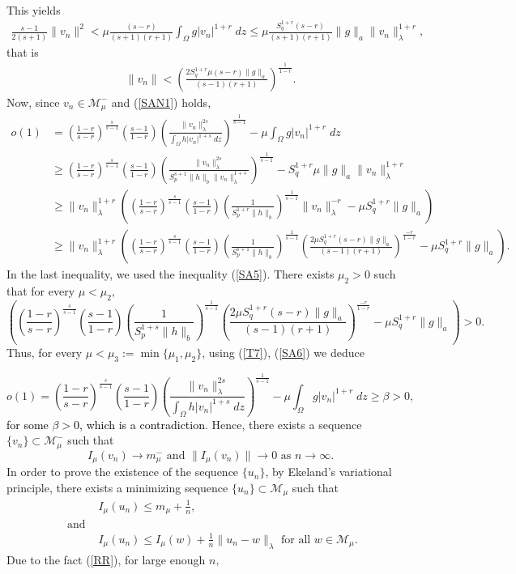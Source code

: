 \documentclass[12pt, notitlepage]{article}
\begin{document}
{\begin{align}
 \end{align}
This yields
\begin{align}
    \frac{s-1}{2(s+1)}\|v_n\|^2<\mu\frac{(s-r)}{(s+1)(r+1)}\int_\Omega g|v_n|^{1+r}\;dz\leq \mu\frac{S_q^{1+r}(s-r)}{(s+1)(r+1)}\|g\|_a\|v_n\|_\lambda^{1+r},
\end{align}
that is
\begin{align}\label{SA5}
    \|v_n\|<\left ( \frac{2S_q^{1+r}\mu(s-r)\|g\|_a}{(s-1)(r+1)}  \right )^\frac{1}{1-r}.
\end{align}
Now, since $v_n\in\mathcal{M}^-_\mu$ and (\ref{SAN1}) holds,
\begin{align}\label{SA6}
o(1)&=\left(\frac{1-r}{s-r}\right)^\frac{s}{s-1}\left(\frac{s-1}{1-r}\right)\left(\frac{\|v_n\|_\lambda^{2s}}{\int_\Omega h|v_n|^{1+s}\;dz}\right )^\frac{1}{s-1}-\mu\int_\Omega g|v_n|^{1+r}\;dz\nonumber\\
&\geq \left(\frac{1-r}{s-r}\right)^\frac{s}{s-1}\left(\frac{s-1}{1-r}\right)\left(\frac{\|v_n\|_\lambda^{2s}}{S_p^{s+1}\|h\|_b\|v_n\|_\lambda^{1+s}}\right )^\frac{1}{s-1}-S_q^{1+r}\mu\|g\|_a\|v_n\|_\lambda^{1+r}\nonumber\\
&\geq \|v_n\|_\lambda^{1+r}\left (      \left(\frac{1-r}{s-r}\right)^\frac{s}{s-1}\left(\frac{s-1}{1-r}\right)\left(\frac{1}{S_p^{1+r}\|h\|_b}  \right )^\frac{1}{s-1}\|v_n\|_\lambda^{-r}-\mu S_q^{1+r}\|g\|_a  \right )\nonumber\\
&\geq \|v_n\|_\lambda^{1+r}\left (      \left(\frac{1-r}{s-r}\right)^\frac{s}{s-1}\left(\frac{s-1}{1-r}\right)\left(\frac{1}{S_p^{s+1}\|h\|_b}  \right )^\frac{1}{s-1}\left ( \frac{2\mu S_q^{1+r}(s-r)\|g\|_a}{(s-1)(r+1)}  \right )^\frac{-r}{1-r}-\mu S_q^{1+r}\|g\|_a  \right ).
\end{align}
In the last inequality, we used the inequality (\ref{SA5}). There exists $\mu_2>0$ such that for every $\mu<\mu_2,$ $$\left (      \left(\frac{1-r}{s-r}\right)^\frac{s}{s-1}\left(\frac{s-1}{1-r}\right)\left(\frac{1}{S_p^{1+s}\|h\|_b}  \right )^\frac{1}{s-1}\left ( \frac{2\mu S_q^{1+r}(s-r)\|g\|_a}{(s-1)(r+1)}  \right )^\frac{-r}{1-r}-\mu S_q^{1+r}\|g\|_a  \right )>0.$$
Thus, for every $\mu<\mu_3:=\min\{\mu_1,\mu_2\}$, using (\ref{T7}), (\ref{SA6}) we deduce

$$o(1)=\left(\frac{1-r}{s-r}\right)^\frac{s}{s-1}\left(\frac{s-1}{1-r}\right)\left(\frac{\|v_n\|_\lambda^{2s}}{\int_\Omega h|v_n|^{1+s}\;dz}\right )^\frac{1}{s-1}-\mu\int_\Omega g|v_n|^{1+r}\;dz\geq \beta>0,$$
\textcolor{black}{for some $\beta>0$, which is a contradiction}. Hence, there exists a sequence $\{v_n\}\subset\mathcal{M}^-_\mu$ such that $$I_\mu(v_n)\to m^-_\mu \text{ and } \|I_\mu(v_n)\|\to 0 \text{ as }n\to\infty.$$
In order to prove the existence of the sequence $\{u_n\}$, 
by Ekeland's variational principle, there exists a minimizing sequence $\{u_n\}\subset\mathscr{M}_\mu$ such that
\begin{align}
    &I_\mu(u_n)\leq m_\mu+\frac{1}{n},\\
    \text{ and }&\nonumber\\
    &I_\mu(u_n)\leq I_\mu(w)+\frac{1}{n}\|u_n-w\|_\lambda\mbox{ for all } w\in \mathscr{M}_\mu\label{EK1}.
\end{align}
Due to the fact (\ref{RR}), for large enough $n,$

}
\end{document}

